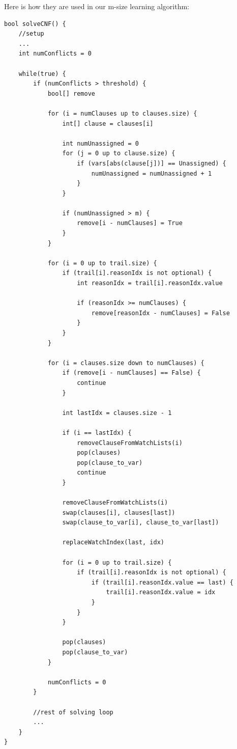 \documentclass[oneside]{book}
\begin{document}
Here is how they are used in our m-size learning algorithm:
\begin{lstlisting}
bool solveCNF() {
    //setup
    ...
    int numConflicts = 0

    while(true) {
        if (numConflicts > threshold) {
            bool[] remove

            for (i = numClauses up to clauses.size) {
                int[] clause = clauses[i]
                
                int numUnassigned = 0
                for (j = 0 up to clause.size) {
                    if (vars[abs(clause[j])] == Unassigned) {
                        numUnassigned = numUnassigned + 1
                    }
                }

                if (numUnassigned > m) {
                    remove[i - numClauses] = True
                }
            }

            for (i = 0 up to trail.size) {
                if (trail[i].reasonIdx is not optional) {
                    int reasonIdx = trail[i].reasonIdx.value

                    if (reasonIdx >= numClauses) {
                        remove[reasonIdx - numClauses] = False
                    }
                }
            }

            for (i = clauses.size down to numClauses) {
                if (remove[i - numClauses] == False) {
                    continue
                }

                int lastIdx = clauses.size - 1

                if (i == lastIdx) {
                    removeClauseFromWatchLists(i)
                    pop(clauses)
                    pop(clause_to_var)
                    continue
                }

                removeClauseFromWatchLists(i)
                swap(clauses[i], clauses[last])
                swap(clause_to_var[i], clause_to_var[last])

                replaceWatchIndex(last, idx)

                for (i = 0 up to trail.size) {
                    if (trail[i].reasonIdx is not optional) {
                        if (trail[i].reasonIdx.value == last) {
                            trail[i].reasonIdx.value = idx
                        }
                    }
                }

                pop(clauses)
                pop(clause_to_var)
            }

            numConflicts = 0
        }

        //rest of solving loop
        ...
    }
} 
\end{lstlisting}
\end{document}
